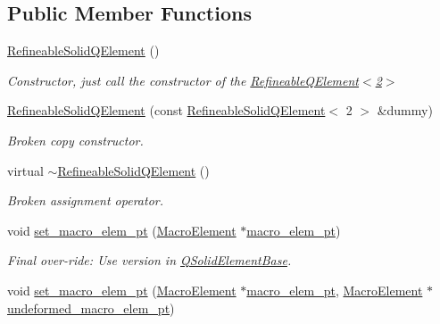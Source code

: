 \subsection*{Public Member Functions}
\begin{DoxyCompactItemize}
\item 
\hyperlink{classoomph_1_1RefineableSolidQElement_3_012_01_4_a9b7ebf008ab9c2eed649dd9bf67a68db}{Refineable\+Solid\+Q\+Element} ()
\begin{DoxyCompactList}\small\item\em Constructor, just call the constructor of the \hyperlink{classoomph_1_1RefineableQElement_3_012_01_4}{Refineable\+Q\+Element$<$2$>$} \end{DoxyCompactList}\item 
\hyperlink{classoomph_1_1RefineableSolidQElement_3_012_01_4_aacbf726ff15d1a33e5f89988012cac14}{Refineable\+Solid\+Q\+Element} (const \hyperlink{classoomph_1_1RefineableSolidQElement}{Refineable\+Solid\+Q\+Element}$<$ 2 $>$ \&dummy)
\begin{DoxyCompactList}\small\item\em Broken copy constructor. \end{DoxyCompactList}\item 
virtual \hyperlink{classoomph_1_1RefineableSolidQElement_3_012_01_4_a72db0bd173ddcb525b42227360a634a9}{$\sim$\+Refineable\+Solid\+Q\+Element} ()
\begin{DoxyCompactList}\small\item\em Broken assignment operator. \end{DoxyCompactList}\item 
void \hyperlink{classoomph_1_1RefineableSolidQElement_3_012_01_4_aac8a230631c509dd854d71a5f68b6483}{set\+\_\+macro\+\_\+elem\+\_\+pt} (\hyperlink{classoomph_1_1MacroElement}{Macro\+Element} $\ast$\hyperlink{classoomph_1_1FiniteElement_aa8bce95f69e3199a508672eea7ecc226}{macro\+\_\+elem\+\_\+pt})
\begin{DoxyCompactList}\small\item\em Final over-\/ride\+: Use version in \hyperlink{classoomph_1_1QSolidElementBase}{Q\+Solid\+Element\+Base}. \end{DoxyCompactList}\item 
void \hyperlink{classoomph_1_1RefineableSolidQElement_3_012_01_4_a8c0cb9d011cc070322945b1fecd03331}{set\+\_\+macro\+\_\+elem\+\_\+pt} (\hyperlink{classoomph_1_1MacroElement}{Macro\+Element} $\ast$\hyperlink{classoomph_1_1FiniteElement_aa8bce95f69e3199a508672eea7ecc226}{macro\+\_\+elem\+\_\+pt}, \hyperlink{classoomph_1_1MacroElement}{Macro\+Element} $\ast$\hyperlink{classoomph_1_1SolidFiniteElement_a20517d8d6ba84c8e90d880f38310915f}{undeformed\+\_\+macro\+\_\+elem\+\_\+pt})

\end{DoxyCompactItemize}
